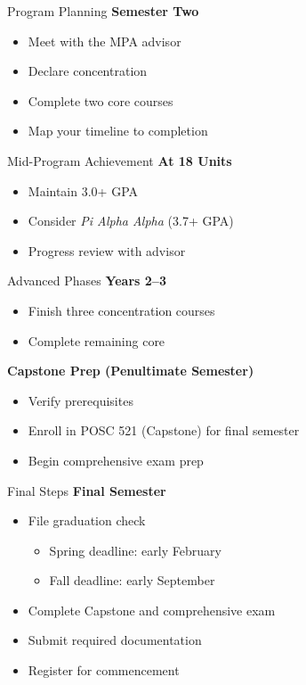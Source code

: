 \documentclass[10pt]{beamer}
\begin{document}
\begin{frame}{Program Planning}
\textbf{Semester Two}
\begin{itemize}
  \item Meet with the MPA advisor
  \item Declare concentration
  \item Complete two core courses
  \item Map your timeline to completion
\end{itemize}
\end{frame}

\begin{frame}{Mid-Program Achievement}
\textbf{At 18 Units}
\begin{itemize}
  \item Maintain 3.0+ GPA
  \item Consider \emph{Pi Alpha Alpha} (3.7+ GPA)
  \item Progress review with advisor
\end{itemize}
\end{frame}

\begin{frame}{Advanced Phases}
\textbf{Years 2--3}
\begin{itemize}
  \item Finish three concentration courses
  \item Complete remaining core
\end{itemize}
\textbf{Capstone Prep (Penultimate Semester)}
\begin{itemize}
  \item Verify prerequisites
  \item Enroll in POSC 521 (Capstone) for final semester
  \item Begin comprehensive exam prep
\end{itemize}
\end{frame}

\begin{frame}{Final Steps}
\textbf{Final Semester}
\begin{itemize}
  \item File graduation check
    \begin{itemize}
      \item Spring deadline: early February
      \item Fall deadline: early September
    \end{itemize}
  \item Complete Capstone and comprehensive exam
  \item Submit required documentation
  \item Register for commencement
\end{itemize}
\end{frame}
\end{document}
